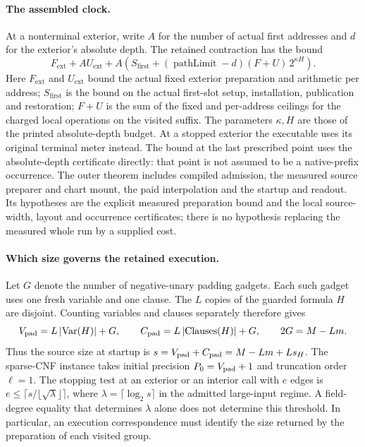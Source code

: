 \documentclass[
  11pt,
]{article}
\begin{document}
\paragraph*{The assembled clock.}
At a nonterminal exterior, write \(A\) for the number of actual first
addresses and \(d\) for the exterior's absolute depth. The retained
contraction has the bound
\[
 F_{\mathrm{ext}}+A U_{\mathrm{ext}}
 +A\left(S_{\mathrm{first}}+
     (\operatorname{pathLimit}-d)(F+U)\,2^{\kappa H}\right).
\]
Here \(F_{\mathrm{ext}}\) and \(U_{\mathrm{ext}}\) bound the actual
fixed exterior preparation and arithmetic per address;
\(S_{\mathrm{first}}\) is the bound on the actual first-slot setup, installation,
publication and restoration; \(F+U\) is the sum of the fixed and per-address
ceilings for the charged local operations on the visited suffix. The parameters \(\kappa,H\) are those of the printed
absolute-depth budget. At a stopped exterior the executable uses its
original terminal meter instead. The bound at the last prescribed
point uses the absolute-depth certificate directly: that point is not
assumed to be a native-prefix occurrence. The outer theorem includes
compiled admission, the measured source preparer and chart mount,
the paid interpolation and the startup and readout. Its hypotheses
are the explicit measured preparation bound and the local
source-width, layout and occurrence certificates; there is no
hypothesis replacing the measured whole run by a supplied cost.


\paragraph*{Which size governs the retained execution.}
Let \(G\) denote the number of negative-unary padding gadgets.
Each such gadget uses one fresh variable and one clause. The \(L\)
copies of the guarded formula \(H\) are disjoint. Counting variables
and clauses separately therefore gives
\[
 V_{\rm pad}=L\,|\mathrm{Var}(H)|+G,\qquad
 C_{\rm pad}=L\,|\mathrm{Clauses}(H)|+G,\qquad 2G=M-Lm .
\]
Thus the source size at startup is \(s=V_{\rm pad}+C_{\rm pad}
=M-Lm+L s_H\). The sparse-CNF instance takes initial precision
\(P_0=V_{\rm pad}+1\) and truncation order \(\ell=1\).
The stopping test at an exterior or an interior call with \(e\) edges is
\(e\le\lceil s/\lfloor\sqrt{\lambda}\rfloor\rceil\), where
\(\lambda=\lceil\log_2 s\rceil\) in the admitted large-input regime.
A field-degree equality that determines \(\lambda\) alone does not
determine this threshold. In particular, an execution correspondence
must identify the size returned by the preparation of each visited group.
\end{document}
